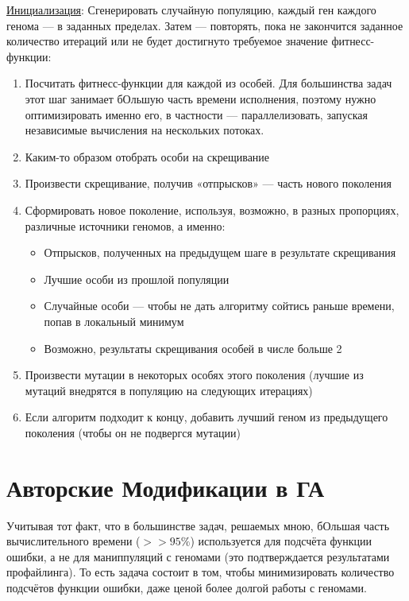 \documentclass[11pt]{article}
\begin{document}
    \underline{Инициализация}: Сгенерировать случайную популяцию, каждый ген каждого генома — в заданных пределах.
    Затем — повторять, пока не закончится заданное количество итераций или не будет достигнуто требуемое значение фитнесс-функции:
    \begin{enumerate}
        \item Посчитать фитнесс-функции для каждой из особей.
        Для большинства задач этот шаг занимает бОльшую часть времени исполнения, поэтому нужно оптимизировать именно его, в частности — параллелизовать, запуская независимые вычисления на нескольких потоках.
        \item Каким-то образом отобрать особи на скрещивание
        \item Произвести скрещивание, получив «отпрысков» — часть нового поколения
        \item Сформировать новое поколение, используя, возможно, в разных пропорциях, различные источники геномов, а именно:
                \begin{itemize}
                    \item Отпрысков, полученных на предыдущем шаге в результате скрещивания
                    \item Лучшие особи из прошлой популяции
                    \item Случайные особи —  чтобы не дать алгоритму сойтись раньше времени, попав в локальный минимум
                    \item Возможно, результаты скрещивания особей в числе больше 2
                \end{itemize}
        \item Произвести мутации в некоторых особях этого поколения (лучшие из мутаций внедрятся в популяцию на следующих итерациях)
        \item Если алгоритм подходит к концу, добавить лучший геном из предыдущего поколения (чтобы он не подвергся мутации)
    \end{enumerate}

    \section{Авторские Модификации  в ГА}

    Учитывая тот факт, что в большинстве задач, решаемых мною, бОльшая часть вычислительного времени ($>> 95\%$) используется для подсчёта функции ошибки, а не для маниппуляций с геномами
    (это подтверждается результатами профайлинга).
    То есть задача состоит в том, чтобы минимизировать количество подсчётов функции ошибки, даже ценой более долгой работы с геномами.
\end{document}
